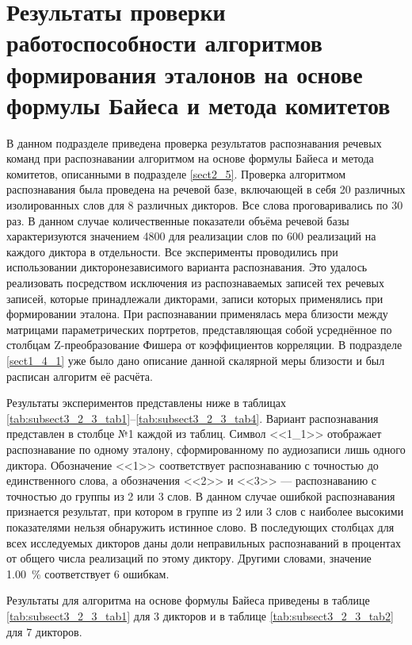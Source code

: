 
\section{Результаты проверки работоспособности алгоритмов формирования эталонов на основе формулы Байеса и метода комитетов} \label{sect3_5}

В данном подразделе приведена проверка результатов распознавания речевых команд при распознавании алгоритмом на основе формулы Байеса и метода комитетов, описанными в подразделе \ref{sect2_5}.
Проверка алгоритмом распознавания была проведена на речевой базе, включающей в себя 20 различных изолированных слов для 8 различных дикторов.
Все слова проговаривались по 30 раз.
В данном случае количественные показатели объёма речевой базы характеризуются значением 4800 для реализации слов по 600 реализаций на каждого диктора в отдельности.
Все эксперименты проводились при использовании дикторонезависимого варианта распознавания.
Это удалось реализовать посредством исключения из распознаваемых записей тех речевых записей, которые принадлежали дикторами, записи которых применялись при формировании эталона.
При распознавании применялась мера близости между матрицами параметрических портретов, представляющая собой усреднённое по столбцам Z-преобразование Фишера от коэффициентов корреляции.
В подразделе \ref{sect1_4_1} уже было дано описание данной скалярной меры близости и был расписан алгоритм её расчёта.

Результаты экспериментов представлены ниже в таблицах \ref{tab:subsect3_2_3_tab1}--\ref{tab:subsect3_2_3_tab4}.
Вариант распознавания представлен в столбце №1 каждой из таблиц.
Символ <<1\_1>> отображает распознавание по одному эталону, сформированному по аудиозаписи лишь одного диктора.
Обозначение <<1>> соответствует распознаванию с точностью до единственного слова, а обозначения <<2>> и <<3>> --- распознаванию с точностью до группы из 2 или 3 слов.
В данном случае ошибкой распознавания признается результат, при котором в группе из 2 или 3 слов с наиболее высокими показателями нельзя обнаружить истинное слово.
В последующих столбцах для всех исследуемых дикторов даны доли неправильных распознаваний в процентах от общего числа реализаций по этому диктору.
Другими словами, значение 1.00~\% соответствует 6 ошибкам.

Результаты для алгоритма на основе формулы Байеса приведены в таблице \ref{tab:subsect3_2_3_tab1} для 3 дикторов и в таблице \ref{tab:subsect3_2_3_tab2} для 7 дикторов.

